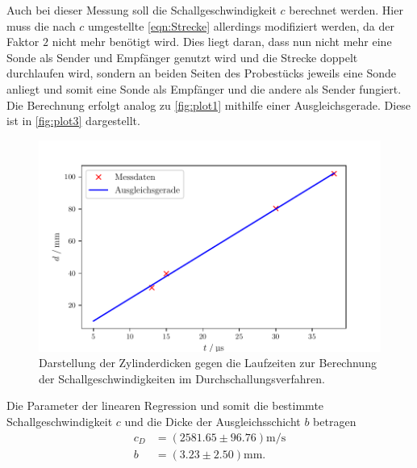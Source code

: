 Auch bei dieser Messung soll die Schallgeschwindigkeit $c$ berechnet werden.
Hier muss die nach $c$ umgestellte \autoref{eqn:Strecke} allerdings modifiziert werden, da der Faktor $2$ nicht mehr benötigt wird.
Dies liegt daran, dass nun nicht mehr eine Sonde als Sender und Empfänger genutzt wird und die Strecke doppelt durchlaufen wird, 
sondern an beiden Seiten des Probestücks jeweils eine Sonde anliegt und somit eine Sonde als Empfänger und die andere als Sender fungiert.
Die Berechnung erfolgt analog zu \autoref{fig:plot1} mithilfe einer Ausgleichsgerade. Diese ist in \autoref{fig:plot3} dargestellt.
\begin{figure}[H]
  \centering
  \includegraphics{build/plot3.pdf}
  \caption {Darstellung der Zylinderdicken gegen die Laufzeiten zur Berechnung der Schallgeschwindigkeiten im Durchschallungsverfahren.}
  \label{fig:plot3}
\end{figure}
Die Parameter der linearen Regression und somit die bestimmte Schallgeschwindigkeit $c$ und die Dicke der Ausgleichsschicht $b$ betragen
\begin{align*}
  c_{D}& =( 2581.65\pm 96.76 ) \si{\meter\per\second}\\
  b &= (3.23\pm 2.50) \si{\milli\meter}.
\end{align*}


